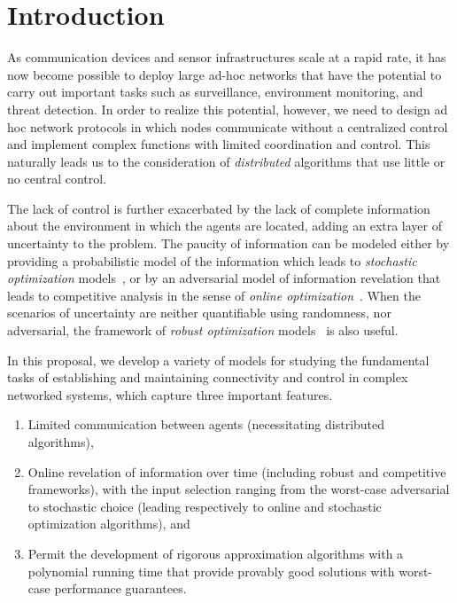 \section{Introduction}
As communication devices and sensor infrastructures scale at a rapid
rate, it has now become possible to deploy large ad-hoc networks that
have the potential to carry out important tasks such as surveillance,
environment monitoring, and threat detection.  In order to realize
this potential, however, we need to design ad hoc network protocols in
which nodes communicate without a centralized control and implement
complex functions with limited coordination and control.  This
naturally leads us to the consideration of {\em distributed}
algorithms that use little or no central control.

The lack of control is further exacerbated by the lack of complete
information about the environment in which the agents are located,
adding an extra layer of uncertainty to the problem. The paucity of
information can be modeled either by providing a probabilistic model
of the information which leads to {\em stochastic optimization}
models~\cite{bl97,rs06}, or by an adversarial model of information
revelation that leads to competitive analysis in the sense of {\em
  online optimization}~\cite{be98,gkr10}. When the scenarios of
uncertainty are neither quantifiable using randomness, nor
adversarial, the framework of {\em robust optimization}
models~\cite{BEN09,dgrs05} is also useful.

In this proposal, we develop a variety of models for studying the
fundamental tasks of establishing and maintaining connectivity and
control in complex networked systems, which capture three important
features.
\begin{enumerate}
\item 
Limited communication between agents (necessitating distributed
algorithms),
\item 
Online revelation of information over time (including robust and
competitive frameworks), with the input selection ranging from the
worst-case adversarial to stochastic choice (leading respectively to
online and stochastic optimization algorithms), and
\item Permit the development of
rigorous approximation algorithms with a polynomial running time that
provide provably good solutions with worst-case performance guarantees. 
\end{enumerate}

